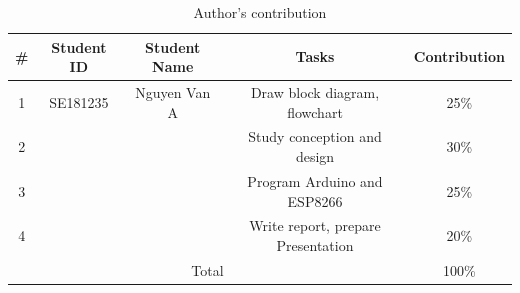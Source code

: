 \documentclass[conference, onecolumn]{IEEEtran}
\begin{document}
\begin{table} [htb] 
	\centering
	\caption{Author's contribution}
	\label{tab:my_label}
	\begin{tabular}{|c|c|c|c|c|}
		\hline
		\#&  Student ID &  Student Name &  Tasks & Contribution\\
		\hline
		1&  SE181235&  Nguyen Van A&  Draw block diagram, flowchart& 25\%\\
		\hline
		2&  &  &  Study conception and design& 30\%\\
		\hline
		3&  &  &  Program Arduino and ESP8266& 25\%\\
		\hline
		4&  &  &  Write report, prepare Presentation & 20\%\\
		\hline
		\multicolumn{4}{|c|}{Total}& 100\%\\
		\hline
	\end{tabular}    
\end{table}


\end{document}
